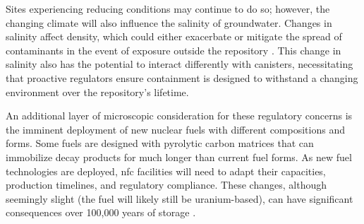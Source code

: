 Sites experiencing reducing conditions may continue to do so; however, the changing climate will also influence the salinity of groundwater. Changes in salinity affect density, which could either exacerbate or mitigate the spread of contaminants in the event of exposure outside the repository \cite{gurban_hydrochemical_2001}. This change in salinity also has the potential to interact differently with canisters, necessitating that proactive regulators ensure containment is designed to withstand a changing environment over the repository's lifetime.

An additional layer of microscopic consideration for these regulatory concerns
is the imminent deployment of new nuclear fuels with different compositions and
forms. Some fuels are designed with pyrolytic carbon matrices that can
immobilize decay products for much longer than current fuel forms. As new fuel
technologies are deployed, \gls{nfc} facilities will need to adapt their
capacities, production timelines, and regulatory compliance. These changes,
although seemingly slight (the fuel will likely still be uranium-based), can
have significant consequences over 100,000 years of storage
\cite{hyland_post_closure_2013}.